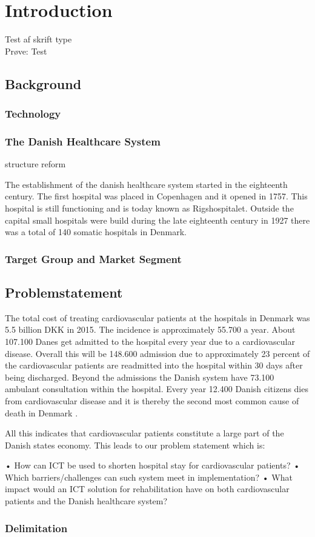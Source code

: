 \chapter{Introduction}


Test af skrift type \\
Prøve: \cite{example} Test

\section{Background}
\subsection{Technology}
\subsection{The Danish Healthcare System}

structure reform 

The establishment of the danish healthcare system started in the eighteenth century. The first hospital was placed in Copenhagen and it opened in 1757. This hospital is still functioning and is today known as Rigshospitalet. Outside the capital small hospitals were build during the late eighteenth century in 1927 there was a total of 140 somatic hospitals in Denmark. 
\subsection{Target Group and Market Segment}


\section{Problemstatement}
The total cost of treating cardiovascular patients at the hospitals in Denmark was 5.5 billion DKK in 2015. The incidence is approximately 55.700 a year. About 107.100 Danes get admitted to the hospital every year due to a cardiovascular disease. Overall this will be 148.600 admission due to approximately 23 percent of the cardiovascular patients are readmitted into the hospital within 30 days after being discharged. Beyond the admissions the Danish system have 73.100 ambulant consultation within the hospital. Every year 12.400 Danish citizens dies from cardiovascular disease and it is thereby the second most common cause of death in Denmark . 

All this indicates that cardiovascular patients constitute a large part of the Danish states economy. This leads to our problem statement which is:

•	How can ICT be used to shorten hospital stay for cardiovascular patients?
•	Which barriers/challenges can such system meet in implementation?
•	What impact would an ICT solution for rehabilitation have on both cardiovascular patients and the Danish healthcare system?


\subsection{Delimitation}
      

